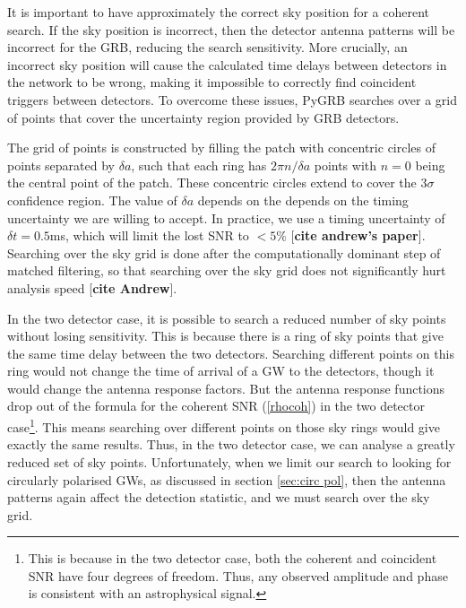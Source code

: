 \documentclass[11pt]{cuthesis}
\begin{document}
It is important to have approximately the correct sky position for a coherent search. If the sky position is incorrect, then the detector antenna patterns will be incorrect for the GRB, reducing the search sensitivity. More crucially, an incorrect sky position will cause the calculated time delays between detectors in the network to be wrong, making it impossible to correctly find coincident triggers between detectors. To overcome these issues, PyGRB searches over a grid of points that cover the uncertainty region provided by GRB detectors. 

The grid of points is constructed by filling the patch with concentric circles of points separated by $\delta a$, such that each ring has $2\pi n / \delta a$ points with $n=0$ being the central point of the patch. These concentric circles extend to cover the $3\sigma$ confidence region. The value of $\delta a$ depends on the depends on the timing uncertainty we are willing to accept. In practice, we use a timing uncertainty of $\delta t = 0.5$ms, which will limit the lost SNR to $<5\%$ [\textbf{cite andrew's paper}]. Searching over the sky grid is done after the computationally dominant step of matched filtering, so that searching over the sky grid does not significantly hurt analysis speed [\textbf{cite Andrew}].

In the two detector case, it is possible to search a reduced number of sky points without losing sensitivity. This is because there is a ring of sky points that give the same time delay between the two detectors. Searching different points on this ring would not change the time of arrival of a GW to the detectors, though it would change the antenna response factors. But the antenna response functions drop out of the formula for the coherent SNR (\ref{rhocoh}) in the two detector case\footnote{This is because in the two detector case, both the coherent and coincident SNR have four degrees of freedom. Thus, any observed amplitude and phase is consistent with an astrophysical signal.}. This means searching over different points on those sky rings would give exactly the same results. Thus, in the two detector case, we can analyse a greatly reduced set of sky points. Unfortunately, when we limit our search to looking for circularly polarised GWs, as discussed in section \ref{sec:circ pol}, then the antenna patterns again affect the detection statistic, and we must search over the sky grid.
\end{document}
